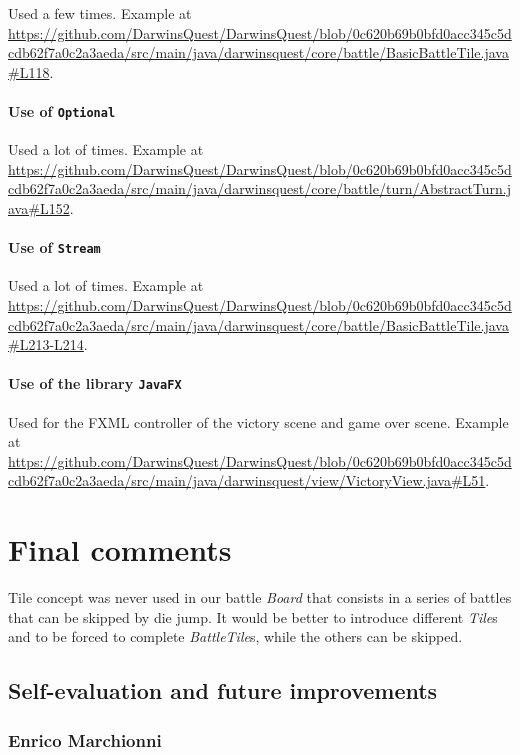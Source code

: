 \documentclass[12pt, a4paper]{report}
\begin{document}
    Used a few times.
    Example at \url{https://github.com/DarwinsQuest/DarwinsQuest/blob/0c620b69b0bfd0acc345c5dcdb62f7a0c2a3aeda/src/main/java/darwinsquest/core/battle/BasicBattleTile.java#L118}.

    \subsubsection{Use of \texttt{Optional}}

    Used a lot of times.
    Example at \url{https://github.com/DarwinsQuest/DarwinsQuest/blob/0c620b69b0bfd0acc345c5dcdb62f7a0c2a3aeda/src/main/java/darwinsquest/core/battle/turn/AbstractTurn.java#L152}.

    \subsubsection{Use of \texttt{Stream}}

    Used a lot of times.
    Example at \url{https://github.com/DarwinsQuest/DarwinsQuest/blob/0c620b69b0bfd0acc345c5dcdb62f7a0c2a3aeda/src/main/java/darwinsquest/core/battle/BasicBattleTile.java#L213-L214}.

    \subsubsection{Use of the library \texttt{JavaFX}}
    Used for the FXML controller of the victory scene and game over scene.
    Example at \url{https://github.com/DarwinsQuest/DarwinsQuest/blob/0c620b69b0bfd0acc345c5dcdb62f7a0c2a3aeda/src/main/java/darwinsquest/view/VictoryView.java#L51}.


\chapter{Final comments}

    Tile concept was never used in our battle \emph{Board} that consists in a series of battles that can be skipped by die jump.
    It would be better to introduce different \emph{Tile}s and to be forced to complete \emph{BattleTile}s, while the others can be skipped.

\section{Self-evaluation and future improvements}

    \subsection*{Enrico Marchionni}
    
\end{document}
